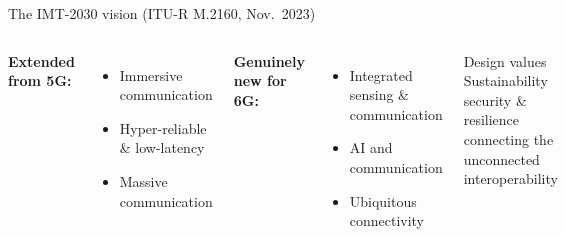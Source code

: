 \begin{frame}{The IMT-2030 vision (ITU-R M.2160, Nov.\ 2023)}
  \begin{columns}[T]
    \textbf{Extended from 5G:}
    \begin{itemize}\itemsep1pt
      \item Immersive communication
      \item Hyper-reliable \& low-latency
      \item Massive communication
    \end{itemize}
    \textbf{Genuinely new for 6G:}
    \begin{itemize}\itemsep1pt
      \item \alert{Integrated sensing \& communication}
      \item \alert{AI and communication}
      \item Ubiquitous connectivity
    \end{itemize}
    \begin{block}{Design values}
      Sustainability \textbullet{} security \& resilience \textbullet{}
      connecting the unconnected \textbullet{} interoperability
    \end{block}
  \end{columns}
\end{frame}

